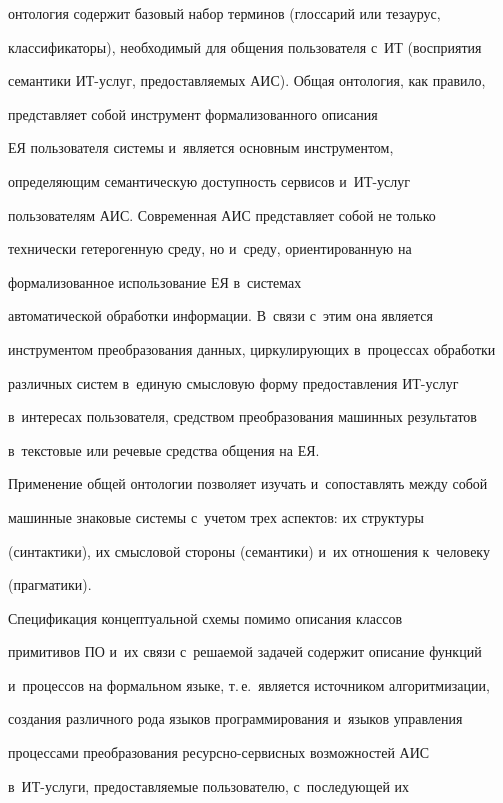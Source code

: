 онтология содержит базовый набор терминов (глоссарий или тезаурус, 


классификаторы), необходимый для общения пользователя с~ИТ (восприятия 


семантики ИТ-услуг, предоставляемых АИС). Общая онтология, как правило, 


представляет собой инструмент формализованного описания 


ЕЯ пользователя системы и~является основным инструментом, 


определяющим семантическую доступность сервисов и~ИТ-услуг 


пользователям АИС. Современная АИС представляет собой не только 


технически гетерогенную среду, но и~среду, ориентированную на 


формализованное использование ЕЯ в~системах 


автоматической обработки информации. В~связи с~этим она является 


инструментом преобразования данных, циркулирующих в~процессах обработки 


различных систем в~единую смысловую форму предоставления ИТ-услуг 


в~интересах пользователя, средством преобразования машинных результатов 


в~текстовые или речевые средства общения на ЕЯ. 


Применение общей онтологии позволяет изучать и~сопоставлять между собой 


машинные знаковые системы с~учетом трех аспектов: их структуры 


(синтактики), их смысловой стороны (семантики) и~их отношения к~человеку 


(прагматики).


  


  Спецификация концептуальной схемы помимо описания классов 


примитивов ПО и~их связи с~решаемой задачей содержит описание функций 


и~процессов на формальном языке, т.\,е.\ является источником алгоритмизации, 


создания различного рода языков программирования и~языков управления 


процессами преобразования ресурсно-сервисных возможностей АИС  


в~ИТ-услуги, предоставляемые пользователю, с~последующей их 


